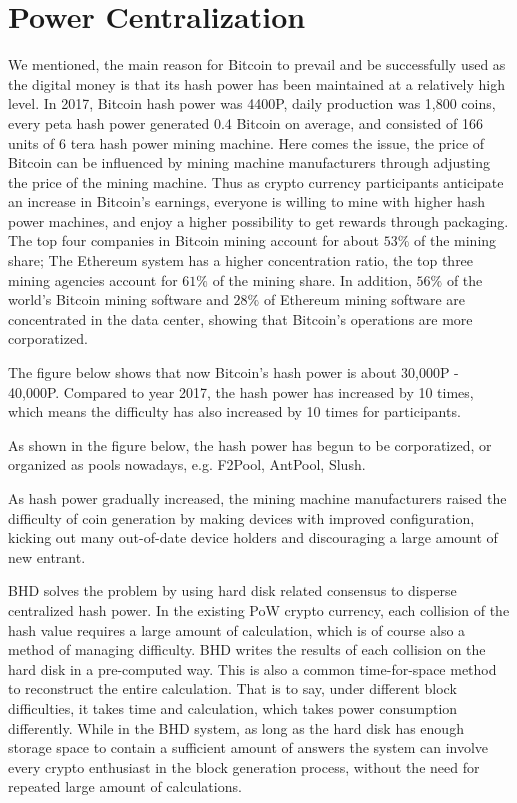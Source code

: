 \section{Power Centralization}
\begin{flushleft}
    We mentioned, the main reason for Bitcoin to prevail and be successfully used as the digital money is that its hash power has been maintained at a relatively high level. In 2017, Bitcoin hash power was 4400P, daily production was 1,800 coins, every peta hash power generated 0.4 Bitcoin on average, and consisted of 166 units of 6 tera hash power mining machine. Here comes the issue, the price of Bitcoin can be influenced by mining machine manufacturers through adjusting the price of the mining machine. Thus as crypto currency participants anticipate an increase in Bitcoin's earnings, everyone is willing to mine with higher hash power machines, and enjoy a higher possibility to get rewards through packaging. The top four companies in Bitcoin mining account for about $53\%$ of the mining share; The Ethereum system has a higher concentration ratio, the top three mining agencies account for $61\%$ of the mining share. In addition, $56\%$ of the world's Bitcoin mining software and $28\%$ of Ethereum mining software are concentrated in the data center, showing that Bitcoin's operations are more corporatized.
\end{flushleft}
\begin{flushleft}
    The figure below shows that now Bitcoin's hash power is about 30,000P - 40,000P. Compared to year 2017, the hash power has increased by 10 times, which means the difficulty has also increased by 10 times for participants.
\end{flushleft}
\begin{flushleft}
    As shown in the figure below, the hash power has begun to be corporatized, or organized as pools nowadays, e.g. F2Pool, AntPool, Slush.
\end{flushleft}
\begin{flushleft}
    As hash power gradually increased, the mining machine manufacturers raised the difficulty of coin generation by making devices with improved configuration, kicking out many out-of-date device holders and discouraging a large amount of new entrant.
\end{flushleft}
\begin{flushleft}
    BHD solves the problem by using hard disk related consensus to disperse centralized hash power. In the existing PoW crypto currency, each collision of the hash value requires a large amount of calculation, which is of course also a method of managing difficulty. BHD writes the results of each collision on the hard disk in a pre-computed way. This is also a common time-for-space method to reconstruct the entire calculation. That is to say, under different block difficulties, it takes time and calculation, which takes power consumption differently. While in the BHD system, as long as the hard disk has enough storage space to contain a sufficient amount of answers the system can involve every crypto enthusiast in the block generation process, without the need for repeated large amount of calculations.
\end{flushleft}
